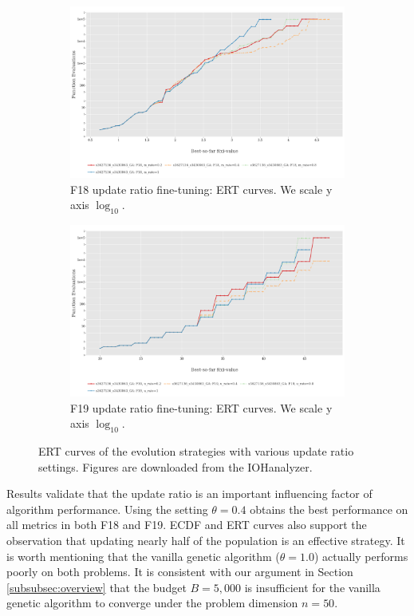 \documentclass{article}
\begin{document}
\begin{figure}[!ht]
    \begin{subfigure}[h]{0.95\linewidth}
        \includegraphics[width=\linewidth]{ga/f18/urate_ert.png}
        \caption{F18 update ratio fine-tuning: ERT curves. We scale y axis $\log_{10}$.}
    \end{subfigure}
    \hfill
    \begin{subfigure}[h]{0.95\linewidth}
        \includegraphics[width=\linewidth]{ga/f19/urate_ert.png}
        \caption{F19 update ratio fine-tuning: ERT curves. We scale y axis $\log_{10}$.}
    \end{subfigure}
    \caption{ERT curves of the evolution strategies with various update ratio settings. Figures are downloaded from the IOHanalyzer.}
    \label{fig:experi-ga-urate-ert}
\end{figure}

Results validate that the update ratio is an important influencing factor of algorithm performance. Using the setting $\theta = 0.4$ obtains the best performance on all metrics in both F18 and F19. ECDF and ERT curves also support the observation that updating nearly half of the population is an effective strategy. It is worth mentioning that the vanilla genetic algorithm ($\theta = 1.0$) actually performs poorly on both problems. It is consistent with our argument in Section \ref{subsubsec:overview} that the budget $B = 5,000$ is insufficient for the vanilla genetic algorithm to converge under the problem dimension $n = 50$.
\end{document}
